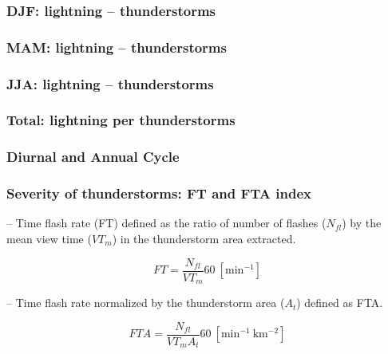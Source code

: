 \documentclass[smaller]{beamer}
\begin{document}
\begin{frame}
\frametitle{DJF: lightning -- thunderstorms}

\end{frame}

\begin{frame}
\frametitle{MAM: lightning -- thunderstorms}

\end{frame}

\begin{frame}
\frametitle{JJA: lightning -- thunderstorms}

\end{frame}


\begin{frame}
\frametitle{Total: lightning per thunderstorms}

\end{frame}


\begin{frame}
\frametitle{Diurnal and Annual Cycle}

\end{frame} 


\begin{frame}
\frametitle{}

\end{frame}


\begin{frame}
\frametitle{}

\end{frame}





\begin{frame}
\frametitle{Severity of thunderstorms: FT and FTA index}

-- Time flash rate (FT) defined as the ratio of number of flashes ($N_{fl}$) by the mean view time ($VT_m$) in the thunderstorm area extracted.	

\begin{equation}
FT = \frac{N_{fl} }{VT_m} 60 ~[\mathrm{min^{-1}}]  
\label{eqFT}  
\end{equation}

-- Time flash rate normalized by the thunderstorm area ($A_t$) defined as FTA. 

\begin{equation}
FTA = \frac{N_{fl}}{VT_m A_t } 60 ~[\mathrm{min^{-1}~km^{-2}}]
\label{eqFTA}
\end{equation}


\end{frame}
\end{document}

